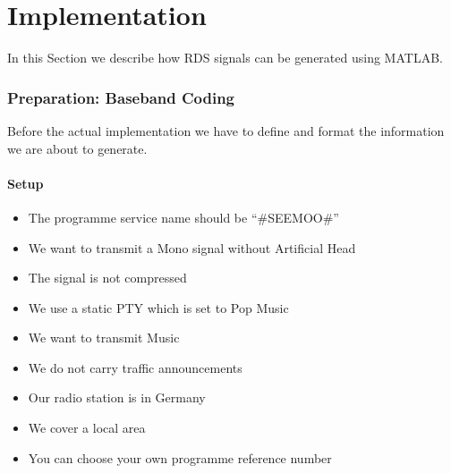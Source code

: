 \documentclass[sigconf]{acmart}
\begin{document}



\section{Implementation}

In this Section we describe how RDS signals can be generated using
MATLAB.

\hypertarget{Preparation:ux20Basebandux20Coding}{%
\subsubsection{Preparation: Baseband
Coding}\label{Preparation:ux20Basebandux20Coding}}

Before the actual implementation we have to define and format the
information we are about to generate.

\hypertarget{Setup}{%
\paragraph{Setup}\label{Setup}}

\begin{itemize}
\tightlist
\item The programme service name should be ``\#SEEMOO\#''
\item We want to transmit a Mono signal without Artificial Head
\item The signal is not compressed
\item We use a static PTY which is set to Pop Music
\item We want to transmit Music
\item We do not carry traffic announcements
\item Our radio station is in Germany
\item We cover a local area
\item You can choose your own programme reference number
\end{itemize}
\end{document}
